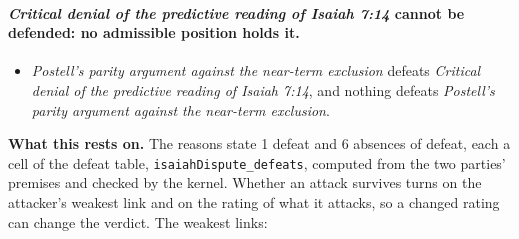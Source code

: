 \documentclass[11pt]{article}
\begin{document}
\paragraph{\emph{Critical denial of the predictive reading of Isaiah 7:14} cannot be defended: no admissible position holds it.}
\begin{itemize}
\item \emph{Postell’s parity argument against the near-term exclusion} defeats \emph{Critical denial of the predictive reading of Isaiah 7:14}, and nothing defeats \emph{Postell’s parity argument against the near-term exclusion}.
\end{itemize}
\par\noindent\textbf{What this rests on.} The reasons state 1 defeat and 6 absences of defeat, each a cell of the defeat table, \texttt{isaiah\allowbreak{}Dispute\_\allowbreak{}defeats}, computed from the two parties' premises and checked by the kernel. Whether an attack survives turns on the attacker's weakest link and on the rating of what it attacks, so a changed rating can change the verdict. The weakest links:
\end{document}
